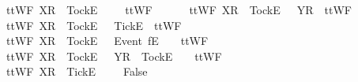 \begin{isabellebody}
\ \ {\isachardoublequoteopen}ttWF{}\ {\isacharparenleft}{\isacharbrackleft}X{\isacharbrackright}\isactrlsub R\ {\isacharhash}\ {\isacharbrackleft}Tock{\isacharbrackright}\isactrlsub E\ {\isacharhash}\ {\isasymsigma}{\isacharparenright}\ {\isacharbrackleft}{\isacharbrackright}\ {\isacharequal}\ ttWF{}\ {\isasymsigma}\ {\isacharbrackleft}{\isacharbrackright}{\isachardoublequoteclose}\ {\isacharbar}\ \isanewline
\ \ {\isachardoublequoteopen}ttWF{}\ {\isacharparenleft}{\isacharbrackleft}X{\isacharbrackright}\isactrlsub R\ {\isacharhash}\ {\isacharbrackleft}Tock{\isacharbrackright}\isactrlsub E\ {\isacharhash}\ {\isasymsigma}{\isacharparenright}\ {\isacharbrackleft}{\isacharbrackleft}Y{\isacharbrackright}\isactrlsub R{\isacharbrackright}\ {\isacharequal}\ ttWF{}\ {\isasymsigma}\ {\isacharbrackleft}{\isacharbrackright}{\isachardoublequoteclose}\ {\isacharbar}\ \isanewline
\ \ {\isachardoublequoteopen}ttWF{}\ {\isacharparenleft}{\isacharbrackleft}X{\isacharbrackright}\isactrlsub R\ {\isacharhash}\ {\isacharbrackleft}Tock{\isacharbrackright}\isactrlsub E\ {\isacharhash}\ {\isasymsigma}{\isacharparenright}\ {\isacharbrackleft}{\isacharbrackleft}Tick{\isacharbrackright}\isactrlsub E{\isacharbrackright}\ {\isacharequal}\ ttWF{}\ {\isasymsigma}\ {\isacharbrackleft}{\isacharbrackright}{\isachardoublequoteclose}\ {\isacharbar}\ \isanewline
\ \ {\isachardoublequoteopen}ttWF{}\ {\isacharparenleft}{\isacharbrackleft}X{\isacharbrackright}\isactrlsub R\ {\isacharhash}\ {\isacharbrackleft}Tock{\isacharbrackright}\isactrlsub E\ {\isacharhash}\ {\isasymrho}{\isacharparenright}\ {\isacharparenleft}{\isacharbrackleft}Event\ f{\isacharbrackright}\isactrlsub E\ {\isacharhash}\ {\isasymsigma}{\isacharparenright}\ {\isacharequal}\ ttWF{}\ {\isasymrho}\ {\isasymsigma}{\isachardoublequoteclose}\ {\isacharbar}\ \isanewline
\ \ {\isachardoublequoteopen}ttWF{}\ {\isacharparenleft}{\isacharbrackleft}X{\isacharbrackright}\isactrlsub R\ {\isacharhash}\ {\isacharbrackleft}Tock{\isacharbrackright}\isactrlsub E\ {\isacharhash}\ {\isasymrho}{\isacharparenright}\ {\isacharparenleft}{\isacharbrackleft}Y{\isacharbrackright}\isactrlsub R\ {\isacharhash}\ {\isacharbrackleft}Tock{\isacharbrackright}\isactrlsub E\ {\isacharhash}\ {\isasymsigma}{\isacharparenright}\ {\isacharequal}\ ttWF{}\ {\isasymrho}\ {\isasymsigma}{\isachardoublequoteclose}\ {\isacharbar}\isanewline
\ \ {\isachardoublequoteopen}ttWF{}\ {\isacharparenleft}{\isacharbrackleft}X{\isacharbrackright}\isactrlsub R\ {\isacharhash}\ {\isacharbrackleft}Tick{\isacharbrackright}\isactrlsub E\ {\isacharhash}\ {\isasymrho}{\isacharparenright}\ {\isasymsigma}\ {\isacharequal}\ False{\isachardoublequoteclose}\ {\isacharbar}\isanewline

\end{isabellebody}

